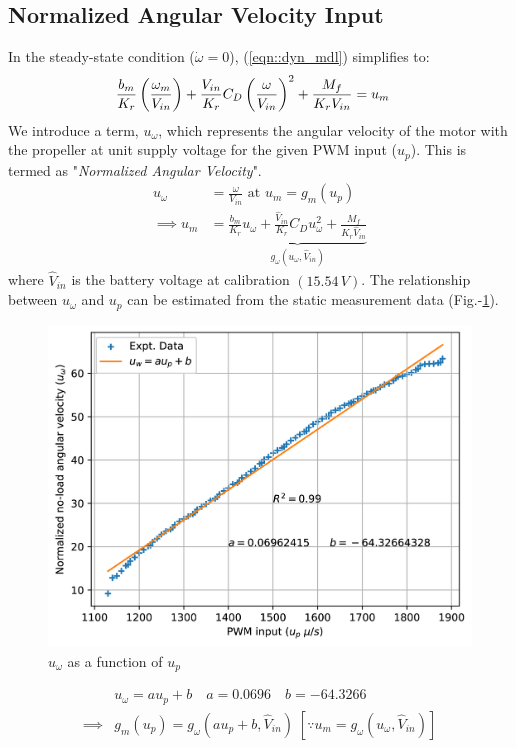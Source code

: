 \subsection{Normalized Angular Velocity Input}
In the steady-state condition ($\dot \omega = 0$), (\ref{eqn::dyn_mdl}) simplifies to:
\begin{align}
    &\frac{b_m}{K_r} \left(\frac{\omega_m}{V_{in}}\right) + \frac{V_{in}}{K_r} C_D \left( \frac{\omega}{V_{in}} \right)^2 + \frac{M_f}{K_r V_{in}} = u_m
\end{align}
We introduce a term, $u_{\omega}$, which represents the angular velocity of the motor with the propeller at unit supply voltage for the given PWM input ($u_p$). This is termed as "\textit{Normalized Angular Velocity}".
\begin{align}
    u_{\omega} &= \frac{\omega}{V_{in}} \text{  at  } u_m = g_m(u_p) \\
    \implies u_m &= \underbrace{\frac{b_m}{K_r} u_\omega + \frac{\hat V_{in}}{K_r} C_D u_\omega^2 + \frac{M_f}{K_r  \hat V_{in}}}_{g_\omega (u_\omega, \hat V_{in})}
     \label{eqn::input_def}
\end{align}
where $\hat V_{in}$ is the battery voltage at calibration $(15.54\,V)$.
The relationship between $u_\omega$ and $u_p$ can be estimated from the static
measurement data (Fig.-\ref{fig::norm_omega}).
\begin{figure}[h]
    \centering
    \includegraphics[width = \figsize]{./figs/figs_acc/norm_omega/no-load_rpm.png}
    \caption{$u_\omega$ as a function of $u_p$}
    \label{fig::norm_omega}
\end{figure}
\begin{align}
    &u_\omega = a u_p + b
    \quad a = 0.0696
    \quad b = -64.3266   \label{eqn::uw_calib}\\
    \implies& g_m(u_p) = g_\omega(a u_p  + b, \hat V_{in})
    \; [\because u_m = g_\omega(u_\omega, \hat V_{in})]
\end{align}
